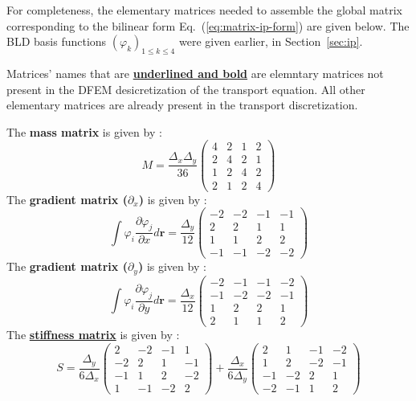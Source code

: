 \documentclass{mc2013}
\newcommand\br{\mathbf{r}}
\newcommand\tf{\varphi}
\renewcommand{\(}{\left(}
\renewcommand{\)}{\right)}
\renewcommand{\[}{\left[}
\renewcommand{\]}{\right]}
\newcommand{\eqt}[1]{Eq.~(\ref{#1})}                     %
\begin{document}
For completeness, the elementary matrices needed to assemble the global matrix corresponding to the
bilinear form \eqt{eq:matrix-ip-form} are given below. The BLD basis functions $\( \tf_{k} \)_{1 \le k \le 4}$
were given earlier, in Section~\ref{sec:ip}. 

Matrices' names that are \underline{{\bf underlined and bold}} are elemntary matrices not present in the DFEM
desicretization of the transport equation. All other elementary matrices are already present in the transport discretization.

The {\bf mass matrix} is given by :
\begin{equation}
M = \frac{{\Delta _x}{\Delta _y}}{36}
\begin{pmatrix}
4 & 2 & 1 & 2 \\
2 & 4 & 2 & 1 \\
1 & 2 & 4 & 2 \\
2 & 1 & 2 & 4 
\end{pmatrix}
\end{equation}
The {\bf gradient matrix ($\partial_x$)} is given by :
\begin{equation}
\int \tf_i \frac{\partial \tf_j}{\partial x} d\br = \frac{{\Delta _y}}{12}
\begin{pmatrix}
 -2 & -2 & -1 & -1 \\
  2 &  2 &  1 &  1\\
  1 &  1 &  2 &  2\\
 -1 & -1 & -2 & -2
\end{pmatrix}
\end{equation}
The {\bf gradient matrix ($\partial_y$)} is given by :
\begin{equation}
\int \tf_i \frac{\partial \tf_j}{\partial y} d\br = \frac{{\Delta _x}}{12}
\begin{pmatrix}
 -2 & -1 & -1 & -2 \\
 -1 & -2 & -2 & -1\\
  1 &  2 &  2 &  1\\
  2 &  1 &  1 &  2
\end{pmatrix}
\end{equation}
The \underline{{\bf stiffness matrix}} is given by :
\begin{equation}
S = \frac{{\Delta _y}}{6{\Delta _x}}
\begin{pmatrix}
2 & -2 & -1 & 1 \\
-2 & 2 & 1 & -1 \\
-1 & 1 & 2 & -2 \\
1 & -1 & -2 & 2 
\end{pmatrix}
+ \frac{{\Delta _x}}{6{\Delta _y}}
\begin{pmatrix}
2 & 1 & -1 & -2 \\
1 & 2 & -2 & -1 \\
-1 & -2 & 2 & 1 \\
-2 & -1 & 1 & 2 
\end{pmatrix}
\end{equation}
\end{document}
